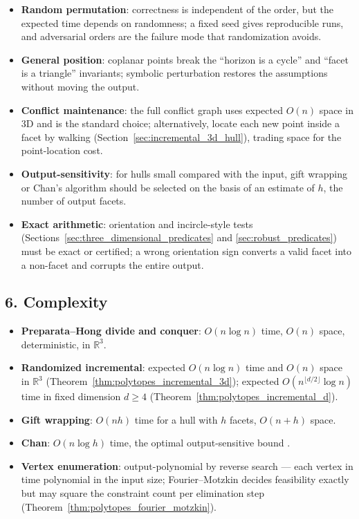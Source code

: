 \begin{itemize}
\item \textbf{Random permutation}: correctness is independent of the order,
  but the expected time depends on randomness; a fixed seed gives
  reproducible runs, and adversarial orders are the failure mode that
  randomization avoids.
\item \textbf{General position}: coplanar points break the ``horizon is a
  cycle'' and ``facet is a triangle'' invariants; symbolic perturbation
  restores the assumptions without moving the output.
\item \textbf{Conflict maintenance}: the full conflict graph uses expected
  $O(n)$ space in 3D and is the standard choice; alternatively, locate each
  new point inside a facet by walking (Section~\ref{sec:incremental_3d_hull}),
  trading space for the point-location cost.
\item \textbf{Output-sensitivity}: for hulls small compared with the input,
  gift wrapping or Chan's algorithm should be selected on the basis of an
  estimate of $h$, the number of output facets.
\item \textbf{Exact arithmetic}: orientation and incircle-style tests
  (Sections~\ref{sec:three_dimensional_predicates} and
  \ref{sec:robust_predicates}) must be exact or certified; a wrong
  orientation sign converts a valid facet into a non-facet and corrupts the
  entire output.
\end{itemize}

\subsection{6. Complexity}

\begin{itemize}
\item \textbf{Preparata--Hong divide and conquer}: $O(n \log n)$ time,
  $O(n)$ space, deterministic, in $\mathbb{R}^3$.
\item \textbf{Randomized incremental}: expected $O(n \log n)$ time and
  $O(n)$ space in $\mathbb{R}^3$ (Theorem~\ref{thm:polytopes_incremental_3d});
  expected $O(n^{\lfloor d/2 \rfloor} \log n)$ time in fixed dimension
  $d \ge 4$ (Theorem~\ref{thm:polytopes_incremental_d}).
\item \textbf{Gift wrapping}: $O(n h)$ time for a hull with $h$ facets,
  $O(n + h)$ space.
\item \textbf{Chan}: $O(n \log h)$ time, the optimal output-sensitive bound
  \cite{chan1996}.
\item \textbf{Vertex enumeration}: output-polynomial by reverse search
  \cite{avis1992} --- each vertex in time polynomial in the input size;
  Fourier--Motzkin decides feasibility exactly but may square the constraint
  count per elimination step (Theorem~\ref{thm:polytopes_fourier_motzkin}).
\end{itemize}


